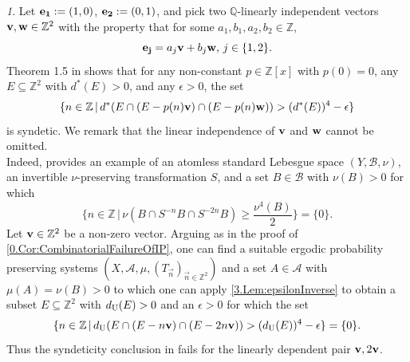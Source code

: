 \documentclass[11pt,american,preprint]{elsarticle}
\numberwithin{equation}{section}
\theoremstyle{plain}
\theoremstyle{plain*}
\theoremstyle{plain}
\theoremstyle{plain*}
\theoremstyle{plain}
\theoremstyle{plain*}
\theoremstyle{remark}
\theoremstyle{remark*}
\theoremstyle{remark}
\newtheorem{rem}[thm]{\protect\remarkname}
\theoremstyle{remark*}
\theoremstyle{remark}
\theoremstyle{remark*}
\theoremstyle{plain}
\theoremstyle{definition}
\theoremstyle{plain}
\theoremstyle{plain} %
\providecommand{\remarkname}{Remark}
\newcommand{\Q}{\mathbb{Q}}
\newcommand{\Z}{\mathbb{Z}}
\begin{document}
\begin{rem}\label{0.WMPrinciple}
Let ${\bf e_1}:=(1,0)$, ${\bf e_2}:=(0,1)$, and pick two $\Q$-linearly independent vectors ${\bf v},{\bf w}\in\Z^2$ with the property that for some $a_1,b_1,a_2,b_2\in\Z$, 
$${\bf e_j}=a_j{\bf v}+b_j{\bf w},\,j\in\{1,2\}.$$
Theorem 1.5 in \cite{FraKu2025ergodic} shows that for any non-constant $p\in\Z[x]$ with $p(0)=0$, any $E\subseteq \Z^2$ with $d^*(E)>0$, and any $\epsilon>0$, the set 
$$
\{n\in\Z\,|\,d^*(E\cap (E-p(n){\bf v})\cap (E-p(n){\bf w}))>(d^*(E))^4-\epsilon\}
$$
is syndetic. We remark that the linear independence of ${\bf v}$ and ${\bf w}$ cannot be omitted.\\
Indeed, \cite[Theorem 2.1]{BHKNilSystems2005} provides an example of an atomless standard Lebesgue space $(Y,\mathcal B,\nu)$, an invertible  $\nu$-preserving transformation $S$, and  a set $B\in\mathcal B$ with $\nu(B)>0$ for which 
$$
\{n\in\Z\,|\,\nu(B\cap S^{-n}B\cap S^{-2n}B)\geq\frac{\nu^{4}(B)}{2}\}=\{0\}.
$$
Let ${\bf v}\in\Z^2$ be a non-zero vector. Arguing as in the proof of \cref{0.Cor:CombinatorialFailureOfIP}, one can find a suitable ergodic probability preserving systems $(X,\mathcal A,\mu,(T_{\vec n})_{\vec n\in\Z^2})$ and  a set $A\in\mathcal A$ with $\mu(A)=\nu(B)>0$  to which one can apply \cref{3.Lem:epsilonInverse} to obtain  a subset $E\subseteq \Z^2$ with $d_{{\rm U}}(E)>0$ and an $\epsilon>0$ for which the set 
    $$\{ n\in\Z\,|\,d_{{\rm U}}(E\cap (E-n{\bf v})\cap (E-2n{\bf v}))>(d_{{\rm U}}(E))^{4}-\epsilon\}=\{0\}.$$
Thus the syndeticity conclusion in \cite[Theorem 1.5]{FraKu2025ergodic} fails for the linearly dependent pair ${\bf v},{2\bf v}$.
\end{rem}
\end{document}
